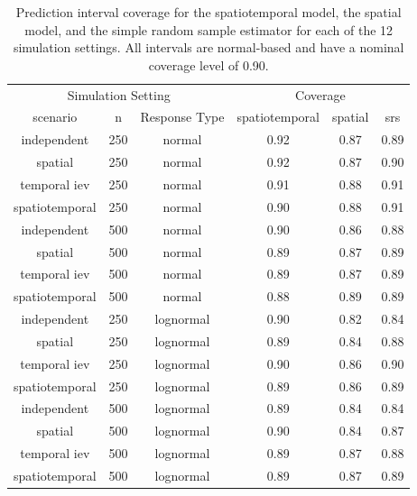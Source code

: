 \documentclass[]{interact}
\theoremstyle{plain}%
\theoremstyle{definition}
\theoremstyle{remark}
\begin{document}
\begin{table}[H]

\caption{\label{tab:simpitab}Prediction interval coverage for the spatiotemporal model, the spatial model, and the simple random sample estimator for each of the 12 simulation settings. All intervals are normal-based and have a nominal coverage level of 0.90.}
\centering
\begin{tabular}[t]{cccccc}
\toprule
\multicolumn{3}{c}{Simulation Setting} & \multicolumn{3}{c}{Coverage} \\
\cmidrule(l{3pt}r{3pt}){1-3} \cmidrule(l{3pt}r{3pt}){4-6}
scenario & n & Response Type & spatiotemporal & spatial & srs\\
\midrule
independent & 250 & normal & 0.92 & 0.87 & 0.89\\
spatial & 250 & normal & 0.92 & 0.87 & 0.90\\
temporal iev & 250 & normal & 0.91 & 0.88 & 0.91\\
spatiotemporal & 250 & normal & 0.90 & 0.88 & 0.91\\
\midrule
independent & 500 & normal & 0.90 & 0.86 & 0.88\\
spatial & 500 & normal & 0.89 & 0.87 & 0.89\\
temporal iev & 500 & normal & 0.89 & 0.87 & 0.89\\
spatiotemporal & 500 & normal & 0.88 & 0.89 & 0.89\\
\midrule
independent & 250 & lognormal & 0.90 & 0.82 & 0.84\\
spatial & 250 & lognormal & 0.89 & 0.84 & 0.88\\
temporal iev & 250 & lognormal & 0.90 & 0.86 & 0.90\\
spatiotemporal & 250 & lognormal & 0.89 & 0.86 & 0.89\\
\midrule
independent & 500 & lognormal & 0.89 & 0.84 & 0.84\\
spatial & 500 & lognormal & 0.90 & 0.84 & 0.87\\
temporal iev & 500 & lognormal & 0.89 & 0.87 & 0.88\\
spatiotemporal & 500 & lognormal & 0.89 & 0.87 & 0.89\\
\bottomrule
\end{tabular}
\end{table}



\end{document}
